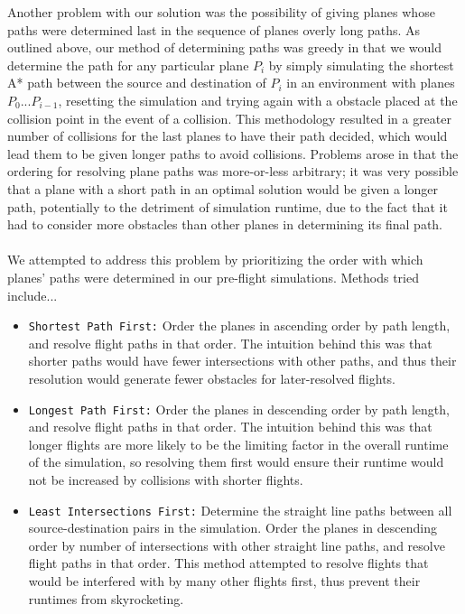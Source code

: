 \documentclass[10pt]{article}
\newcommand{\ms}[1] {
  \texttt{#1}
}
\begin{document}
Another problem with our solution was the possibility of giving planes whose paths were 
determined last in the sequence of planes overly long paths. As outlined above, our
method of determining paths was greedy in that we would determine the path for any 
particular plane $P_i$ by simply simulating the shortest A* path between the source
and destination of $P_i$ in an environment with planes $P_0$...$P_{i-1}$, resetting
the simulation and trying again with a obstacle placed at the collision point in the
event of a collision. This methodology resulted in a greater number of collisions for the
last planes to have their path decided, which would lead them to be given longer paths to
avoid collisions. Problems arose in that the ordering for resolving plane paths was more-or-less
arbitrary; it was very possible that a plane with a short path in an optimal solution would be
given a longer path, potentially to the detriment of simulation runtime, due to the fact
that it had to consider more obstacles than other planes in determining its final path.\\\\
We attempted to address this problem by prioritizing the order with which planes' paths 
were determined in our pre-flight simulations. Methods tried include...
\begin{itemize}
  \item \ms{Shortest Path First:} Order the planes in ascending order by path length, and 
    resolve flight paths in that order. The intuition behind this was that shorter paths
    would have fewer intersections with other paths, and thus their resolution would generate
    fewer obstacles for later-resolved flights.
  \item \ms{Longest Path First:} Order the planes in descending order by path length, and
    resolve flight paths in that order. The intuition behind this was that longer flights
    are more likely to be the limiting factor in the overall runtime of the simulation, 
    so resolving them first would ensure their runtime would not be increased by collisions
    with shorter flights.
  \item \ms{Least Intersections First:} Determine the straight line paths between all
    source-destination pairs in the simulation. Order the planes in descending order by
    number of intersections with other straight line paths, and resolve flight paths in 
    that order. This method attempted to resolve flights that would be interfered with 
    by many other flights first, thus prevent their runtimes from skyrocketing.
\end{itemize}
\end{document}
